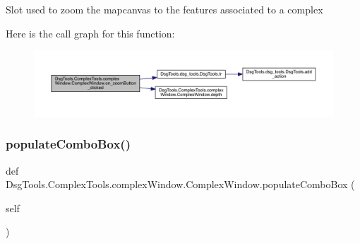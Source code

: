 \begin{DoxyVerb}Slot used to zoom the mapcanvas to the features associated to a complex
\end{DoxyVerb}
 Here is the call graph for this function\+:
\nopagebreak
\begin{figure}[H]
\begin{center}
\leavevmode
\includegraphics[width=350pt]{class_dsg_tools_1_1_complex_tools_1_1complex_window_1_1_complex_window_a7a1f50dd24e8787d4f355318159d2183_cgraph}
\end{center}
\end{figure}
\mbox{\label{class_dsg_tools_1_1_complex_tools_1_1complex_window_1_1_complex_window_a9b2244418126aae98c5d05ef78848ca2}} 
\subsubsection{\texorpdfstring{populate\+Combo\+Box()}{populateComboBox()}}
{\footnotesize\ttfamily def Dsg\+Tools.\+Complex\+Tools.\+complex\+Window.\+Complex\+Window.\+populate\+Combo\+Box (\begin{DoxyParamCaption}\item[{}]{self }\end{DoxyParamCaption})}

